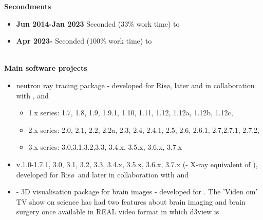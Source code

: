\documentclass[a4paper,12pt]{article}
\begin{document}
{\bf\large Secondments}\\
\begin{itemize}
\item{{\bf Jun 2014-Jan 2023} Seconded (33\% work time) to
    }
\item{{\bf Apr 2023-} Seconded (100\% work time) to
    }
\end{itemize}\ \\
{\bf\large Main software projects}\\
\begin{itemize}
\item{ neutron ray tracing package - developed for
    Ris\o, later
     and   in
    collaboration with ,
     and
    }
    \begin{itemize}
      \item 1.x series: 1.7, 1.8, 1.9, 1.9.1, 1.10, 1.11, 1.12, 1.12a,
        1.12b, 1.12c,
      \item 2.x series: 2.0, 2.1, 2.2, 2.2a, 2.3, 2.4, 2.4.1, 2.5, 2.6, 2.6.1,
        2.7,2.7.1, 2.7.2,
      \item 3.x series: 
        3.0,3.1,3.2,3.3, 3.4.x, 3.5.x, 3.6.x, 3.7.x
      \end{itemize}
\item{
    v.1.0-1.7.1, 3.0, 3.1, 3.2, 3.3, 3.4.x, 3.5.x, 3.6.x, 3.7.x
    (- X-ray equivalent of
    ), developed for Ris\o\ and later
     in
    collaboration with  and
    }
\item{\texttt{} - 3D visualisation package for brain images -
    developed for . The 'Viden
      om' TV show on science has had two features
    about brain imaging and brain
    surgery once available in REAL video format in which d3view is
}
\end{itemize}
\end{document}
